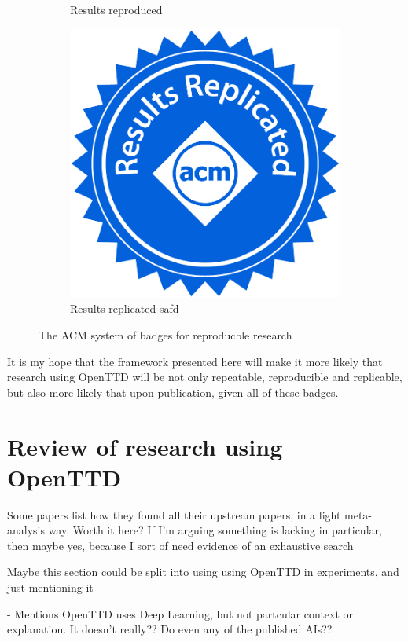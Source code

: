 \documentclass[logo,msc]{infthesis}           %
\begin{document}
\begin{figure}
\begin{subfigure}[t]{0.3\columnwidth}
         \caption{Results reproduced}
         \label{fig:five over x}
     \end{subfigure}
     \begin{subfigure}[t]{0.3\columnwidth}
         \centering
         \includegraphics[width=\textwidth]{assets/results_replicated.jpg}
         \caption{Results replicated  safd }
         \label{fig:five over x}
     \end{subfigure}
        \caption{The ACM system of badges for reproducble research}
        \label{fig:acm_badges}
\end{figure}

It is my hope that the framework presented here will make it more likely that research using OpenTTD will be not only repeatable, reproducible and replicable, but also more likely that upon publication, given all of these badges. 

\section{Review of research using OpenTTD}

\begin{itemize}
\begin{item}
Some papers list how they found all their upstream papers, in a light meta-analysis way. Worth it here? If I'm arguing something is lacking in particular, then maybe yes, because I sort of need evidence of an exhaustive search
\end{item}
\begin{item} Maybe this section could be split into using using OpenTTD in experiments, and just mentioning it
\end{item}
\begin{item}
\cite{fenjiro2018deep} - Mentions OpenTTD uses Deep Learning, but not partcular context or explanation. It doesn't really?? Do even any of the published AIs??
\end{item}
\end{itemize}
\end{document}
